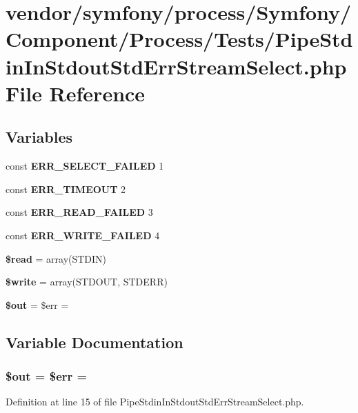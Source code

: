 \section{vendor/symfony/process/\+Symfony/\+Component/\+Process/\+Tests/\+Pipe\+Stdin\+In\+Stdout\+Std\+Err\+Stream\+Select.php File Reference}
\label{_pipe_stdin_in_stdout_std_err_stream_select_8php}
\subsection*{Variables}
\begin{DoxyCompactItemize}
\item 
const {\bf E\+R\+R\+\_\+\+S\+E\+L\+E\+C\+T\+\_\+\+F\+A\+I\+L\+E\+D} 1
\item 
const {\bf E\+R\+R\+\_\+\+T\+I\+M\+E\+O\+U\+T} 2
\item 
const {\bf E\+R\+R\+\_\+\+R\+E\+A\+D\+\_\+\+F\+A\+I\+L\+E\+D} 3
\item 
const {\bf E\+R\+R\+\_\+\+W\+R\+I\+T\+E\+\_\+\+F\+A\+I\+L\+E\+D} 4
\item 
{\bf \$read} = array(S\+T\+D\+I\+N)
\item 
{\bf \$write} = array(S\+T\+D\+O\+U\+T, S\+T\+D\+E\+R\+R)
\item 
{\bf \$out} = \$err = \textquotesingle{}\textquotesingle{}
\end{DoxyCompactItemize}


\subsection{Variable Documentation}
\subsubsection[{\$out}]{\setlength{\rightskip}{0pt plus 5cm}\$out = \$err = \textquotesingle{}\textquotesingle{}}\label{_pipe_stdin_in_stdout_std_err_stream_select_8php_a48cb304902320d173a4eaa41543327b9}


Definition at line 15 of file Pipe\+Stdin\+In\+Stdout\+Std\+Err\+Stream\+Select.\+php.

